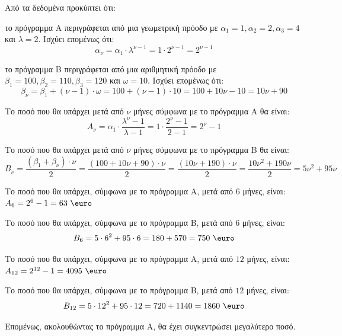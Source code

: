 
\begin{alist}
\item Από τα δεδομένα προκύπτει ότι:
\begin{rlist}
\item το πρόγραμμα Α περιγράφεται από μια γεωμετρική πρόοδο με $\alpha_1 = 1, \alpha_2 = 2, \alpha_3 = 4$ και $\lambda = 2$. Ισχύει επομένως ότι:
\[\alpha_\nu = \alpha_1 \cdot \lambda^{\nu-1} = 1 \cdot 2^{\nu-1} = 2^{\nu-1}\]
\item το πρόγραμμα Β περιγράφεται από μια αριθμητική πρόοδο με $\beta_1 = 100, \beta_2 = 110, \beta_3 = 120$ και $\omega = 10$. Ισχύει επομένως ότι:
\[\beta_\nu = \beta_1 + (\nu - 1) \cdot \omega = 100 + (\nu - 1) \cdot 10 = 100 + 10\nu - 10 = 10\nu + 90\]
\item Το ποσό που θα υπάρχει μετά από $\nu$ μήνες σύμφωνα με το πρόγραμμα Α θα είναι:
\[A_\nu = \alpha_1 \cdot \dfrac{\lambda^\nu - 1}{\lambda - 1} = 1 \cdot \dfrac{2^\nu - 1}{2 - 1} = 2^\nu - 1\]
\item Το ποσό που θα υπάρχει μετά από $\nu$ μήνες σύμφωνα με το πρόγραμμα Β θα είναι:
\[B_\nu = \dfrac{(\beta_1 + \beta_\nu) \cdot \nu}{2} = \dfrac{(100 + 10\nu + 90) \cdot \nu}{2} = \dfrac{(10\nu + 190) \cdot \nu}{2} = \dfrac{10\nu^2 + 190\nu}{2} = 5\nu^2 + 95\nu\]
\end{rlist}

\item
\begin{rlist}
\item Το ποσό που θα υπάρχει, σύμφωνα με το πρόγραμμα Α, μετά από $6$ μήνες, είναι:
$A_6 = 2^6 - 1 = 63\text{ \euro}$

Το ποσό που θα υπάρχει, σύμφωνα με το πρόγραμμα Β, μετά από $6$ μήνες, είναι:
\[B_6 = 5 \cdot 6^2 + 95 \cdot 6 = 180 + 570 = 750\text{ \euro}\]

\item Το ποσό που θα υπάρχει, σύμφωνα με το πρόγραμμα Α, μετά από $12$ μήνες, είναι:
$A_{12} = 2^{12} - 1 = 4095\text{ \euro}$

Το ποσό που θα υπάρχει, σύμφωνα με το πρόγραμμα Β, μετά από $12$ μήνες, είναι:
\[B_{12} = 5 \cdot 12^2 + 95 \cdot 12 = 720 + 1140 = 1860\text{ \euro}\]

Επομένως, ακολουθώντας το πρόγραμμα Α, θα έχει συγκεντρώσει μεγαλύτερο ποσό.
\end{rlist}
\end{alist}

